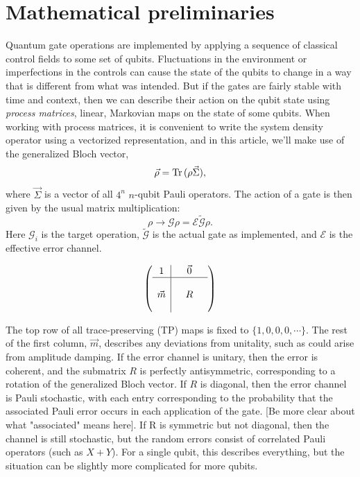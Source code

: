 \documentclass[aps,nofootinbib,pra,notitlepage,twocolumn]{revtex4-1}
\newcommand{\tr}{{\rm Tr\thinspace}}
\newcommand{\note}[1]{{\color{red}[#1]}}
\newcommand{\actual}{\ensuremath{\tilde{\mathcal{G}}}}
\newcommand{\target}{\ensuremath{{\mathcal{G}}}}
\newcommand{\error}{\ensuremath{{\mathcal{E}}}}
\begin{document}
\section{Mathematical preliminaries}
\label{sec:representing_quantum_gates}
Quantum gate operations are implemented by applying a sequence of classical control fields to some set of qubits. Fluctuations in the environment or imperfections in the controls can cause the state of the qubits to change in a way that is different from what was intended.  But if the gates are fairly stable with time and context, then we can describe their action on the qubit state using \emph{process matrices}, linear, Markovian maps on the state of some qubits.  When working with process matrices, it is convenient to write the system density operator using a vectorized representation, and in this article, we'll make use of the generalized Bloch vector,
\begin{equation}
  \vec \rho = \tr(\rho \vec \Sigma),
\end{equation}
where $\vec \Sigma$ is a vector of all $4^n$ $n$-qubit Pauli operators. The action of a gate is then given by the usual matrix multiplication:
\begin{equation}
  \rho \rightarrow \target\rho = \error \actual \rho.
\end{equation}
Here $\target_i$ is the target operation, $\actual$ is the actual gate as implemented, and $\error$ is the effective error channel. 
 
\begin{equation}
	\left(\begin{array}{c|cccc}
		1 &  & \vec0 & \\ 
		\hline & &  &  \\
		\vec{m} &  & R &  \\
		 &  &  & 
	\end{array} 	
	\right)
\end{equation}

The top row of all trace-preserving (TP) maps is fixed to $\{1,0,0,0,\cdots\}$.  The rest of the first column, $\vec{m}$, describes any deviations from unitality, such as could arise from amplitude damping. If the error channel is unitary, then the error is coherent, and the submatrix $R$ is perfectly antisymmetric, corresponding to a rotation of the generalized Bloch vector. If  $R$ is diagonal, then the error channel is Pauli stochastic, with each entry corresponding to the probability that the associated Pauli error occurs in each application of the gate. \note{Be more clear about what "associated" means here}.  If R is symmetric but not diagonal, then the channel is still stochastic, but the random errors consist of correlated Pauli operators (such as $X+Y$). For a single qubit, this describes everything, but the situation can be slightly more complicated for more qubits. 
\end{document}
